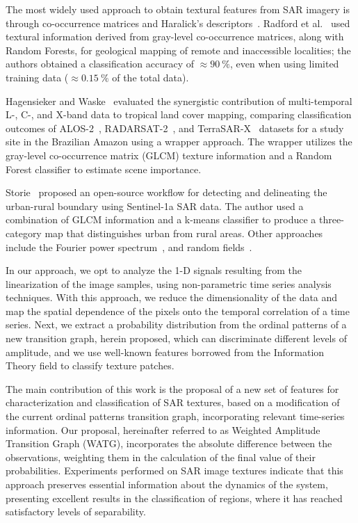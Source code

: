 \documentclass[journal]{IEEEtran}
\begin{document}
The most widely used approach to obtain textural features from SAR imagery is through co-occurrence matrices and Haralick's descriptors~\cite{yu2019detection}.
Radford et al.~\cite{radford2018geological} used textural information derived from gray-level co-occurrence matrices, along with Random Forests, for geological mapping of remote and inaccessible localities; the authors obtained a classification accuracy of $\approx\SI{90}{\percent}$, even when using limited training data ($\approx\SI{0.15}{\percent}$ of the total data). 

Hagensieker and Waske~\cite{hagensieker2018evaluation} evaluated the synergistic contribution of multi-temporal L-, C-, and X-band data to tropical land cover mapping, comparing classification outcomes of ALOS-2~\cite{kankaku2013alos}, RADARSAT-2~\cite{morena2004introduction}, and TerraSAR-X~\cite{breit2009terrasar} 
datasets for a study site in the Brazilian Amazon using a wrapper approach. 
The wrapper utilizes the gray-level co-occurrence matrix (GLCM)
texture information and a  Random Forest classifier to estimate scene importance. 

Storie~\cite{storie2018urban} proposed an open-source workflow for detecting and delineating the urban-rural boundary using Sentinel-1a SAR data.
The author used a combination of GLCM information and a k-means classifier to produce a three-category map that distinguishes urban from rural areas. 
Other approaches include the Fourier power  spectrum~\cite{Florindo2012Fractal}, and random fields~\cite{zhu2016antarctic}.

In our approach, we opt to analyze the 1-D signals resulting from the linearization of the image samples, using non-parametric time series analysis techniques.
With this approach, we reduce the dimensionality of the data and map the spatial dependence of the pixels onto the temporal correlation of a time series.
Next, we extract a probability distribution from the ordinal patterns of a new transition graph, herein proposed, which can discriminate different levels of amplitude, and we use well-known features borrowed from the Information Theory field to classify texture patches.

The main contribution of this work is the proposal of a new set of features for characterization and classification of SAR textures, based on a modification of the current ordinal patterns transition graph, incorporating relevant time-series information.
Our proposal, hereinafter referred to as Weighted Amplitude Transition Graph (WATG), incorporates the absolute difference between the observations, weighting them in the calculation of the final value of their probabilities.
Experiments performed on SAR image textures indicate that this approach preserves essential information about the dynamics of the system, presenting excellent results in the classification of regions, where it has reached satisfactory levels of separability.
\end{document}
